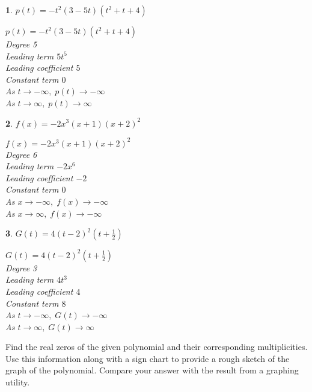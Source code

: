 \documentclass{amsbook}
\newtheorem{exc}{}
\newenvironment{ex}{\begin{exc}\normalfont}{\end{exc}}
\numberwithin{section}{chapter}
\numberwithin{equation}{chapter}
\begin{document}
\begin{multicols}{2}
\begin{ex}
	$p(t) = -t^2(3 - 5t)(t^{2} + t + 4)$
	\begin{sol}
	$p(t) = -t^2(3 - 5t)(t^{2} + t + 4)$\\
	Degree 5 \\
	Leading term $5t^{5}$\\
	Leading coefficient $5$\\
	Constant term $0$\\
	As $t \rightarrow -\infty, \; p(t) \rightarrow -\infty$\\
	As $t \rightarrow \infty, \; p(t) \rightarrow \infty$	
	\end{sol}
\end{ex}

\begin{ex}
	$f(x) = -2x^3(x+1)(x+2)^2$
	\begin{sol}
	$f(x) = -2x^3(x+1)(x+2)^2$ \\
	Degree 6 \\
	Leading term $-2x^{6}$\\
	Leading coefficient $-2$\\
	Constant term $0$\\
	As $x \rightarrow -\infty, \; f(x) \rightarrow -\infty$\\
	As $x \rightarrow \infty, \; f(x) \rightarrow -\infty$	
	\end{sol}
\end{ex}

\begin{ex}
	$G(t) = 4(t-2)^2\left(t+\frac{1}{2}\right)$ 
	\begin{sol}
	$G(t) = 4(t-2)^2\left(t+\frac{1}{2}\right)$ \\
	Degree 3 \\
	Leading term $4t^3$\\
	Leading coefficient $4$\\
	Constant term $8$\\
	As $t \rightarrow -\infty, \; G(t) \rightarrow -\infty$\\
	As $t \rightarrow \infty, \; G(t) \rightarrow \infty$	
	\end{sol}
\end{ex}
\end{multicols}


Find the real zeros of the given polynomial and their corresponding multiplicities.  Use this information along with a sign chart to provide a rough sketch of the graph of the polynomial.  Compare your answer with the result from a graphing utility.
\end{document}
